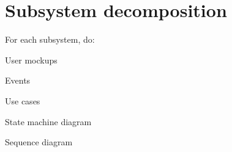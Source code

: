 
\section{Subsystem decomposition}
\label{sec:subsyst-decomp}

For each subsystem, do:
\begin{enum-c}
\item User mockups
\item Events
\item Use cases
\item State machine diagram
\item Sequence diagram
\end{enum-c}




